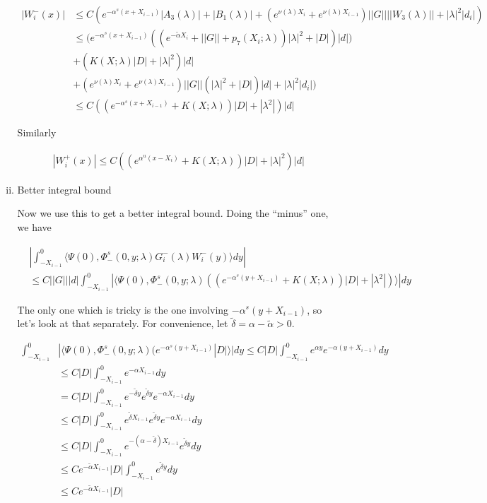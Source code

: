 \documentclass[12pt]{article}
\begin{document}
\begin{enumerate}
\begin{enumerate}[(i)]
\begin{align*}
| W_i^-(x)| &\leq C \left( e^{-\alpha^s(x + X_{i-1})} |A_3(\lambda)| + |B_1(\lambda)| + (e^{\nu(\lambda)X_i} + e^{\nu(\lambda)X_{i-1}} )||G|| ||W_3(\lambda)|| + |\lambda|^2 |d_i|  \right) \\
&\leq \Big( e^{-\alpha^s(x + X_{i-1})}( (e^{-\tilde{\alpha} X_i} + ||G|| + p_7(X_i; \lambda) ) |\lambda|^2  + |D|)|d|) \\
&+ ( K(X; \lambda) |D|+ |\lambda|^2 )|d| \\
&+ (e^{\nu(\lambda)X_i} + e^{\nu(\lambda)X_{i-1}} )||G|| ( |\lambda|^2 + |D|)|d| + |\lambda|^2 |d_i| \Big) \\
&\leq C( (e^{-\alpha^s(x + X_{i-1})} + K(X; \lambda))|D| + |\lambda^2|)|d|
\end{align*}

Similarly

\begin{align*}
| W_i^+(x)| \leq C ( (e^{\alpha^u(x - X_i)} + K(X; \lambda))|D| + |\lambda|^2 )|d|
\end{align*}

\item Better integral bound

Now we use this to get a better integral bound. Doing the ``minus'' one, we have

\begin{align*}
&\left| \int_{-X_{i-1}}^0 \langle \Psi(0), \Phi^s_-(0, y; \lambda) G_i^-(\lambda)W_i^-(y) \rangle dy \right| \\
&\leq C ||G|| |d| \int_{-X_{i-1}}^0 | \langle \Psi(0), \Phi^s_-(0, y; \lambda) ( (e^{-\alpha^s(y + X_{i-1})} + K(X; \lambda))|D| + |\lambda^2|) \rangle | dy
\end{align*}

The only one which is tricky is the one involving ${-\alpha^s(y + X_{i-1})}$, so let's look at that separately. For convenience, let $\tilde{\delta} = \alpha - \tilde{\alpha} > 0$.

\begin{align*}
\int_{-X_{i-1}}^0 &| \langle \Psi(0), \Phi^s_-(0, y; \lambda) (e^{-\alpha^s(y + X_{i-1})} |D| \rangle | dy \leq C |D| \int_{-X_{i-1}}^0 e^{\alpha y} e^{-\alpha(y + X_{i-1})} dy \\
&\leq C |D| \int_{-X_{i-1}}^0 e^{-\alpha X_{i-1}} dy \\
&= C |D| \int_{-X_{i-1}}^0 e^{-\tilde{\delta} y} e^{\tilde{\delta} y}  e^{-\alpha X_{i-1}} dy \\
&\leq C |D| \int_{-X_{i-1}}^0 e^{\tilde{\delta} X_{i-1}} e^{\tilde{\delta} y}  e^{-\alpha X_{i-1}} dy \\
&\leq C |D| \int_{-X_{i-1}}^0 e^{-(\alpha - \tilde{\delta}) X_{i-1}} e^{\tilde{\delta} y} dy \\
&\leq C e^{-\tilde{\alpha} X_{i-1}} |D| \int_{-X_{i-1}}^0 e^{\tilde{\delta} y} dy \\
&\leq C e^{-\tilde{\alpha} X_{i-1}} |D|
\end{align*}


\end{enumerate}
\end{enumerate}
\end{document}
